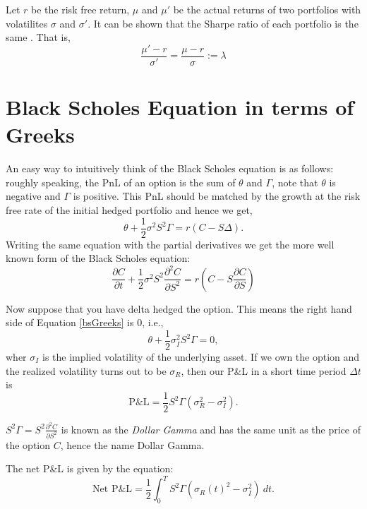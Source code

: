 \documentclass{amsart}
\theoremstyle{plain}
\numberwithin{equation}{section}
\begin{document}
Let $r$ be the risk free return, $\mu$ and $\mu'$ be the 
actual returns of two portfolios with volatilites
$\sigma$ and $\sigma'$. It can be shown that
the Sharpe ratio of each portfolio is 
the same \cite{derman_smile}.
That is,
\begin{equation}
\frac{\mu'-r}{\sigma'} = 
\frac{\mu-r}{\sigma} := \lambda
\end{equation}


\section{Black Scholes Equation in terms of Greeks}
An easy way to intuitively think of the Black Scholes
equation is as follows: roughly speaking, the PnL of 
an option is the sum of $\theta$ and $\Gamma$, note that 
$\theta$ is negative and $\Gamma$ is positive. This PnL
should be matched by the growth at the risk free rate
of the initial hedged portfolio and hence we get,
\begin{equation}
\label{bsGreeks}
\theta + \frac{1}{2}
\sigma^2 S^2 \Gamma
= r(C-S\Delta).
\end{equation}
Writing the same equation with the partial 
derivatives we get the more well known form of the 
Black Scholes equation:
\begin{equation}
\frac{\partial C}{\partial t} + \frac{1}{2}
\sigma^2 S^2 \frac{\partial^2 C}{\partial S^2}
= r(C-S\frac{\partial C}{\partial S})
\end{equation}

Now suppose that you have delta hedged the 
option. This means the right hand side of Equation
\ref{bsGreeks} is $0$, i.e.,\
\begin{equation}
\theta + \frac{1}{2}
\sigma_{I}^2 S^2 \Gamma = 0,
\end{equation}
wher $\sigma_{I}$ is the implied
volatility of the underlying 
asset. If we own the option and the 
realized volatility turns out 
to be $\sigma_{R}$,
then our P\&L in a short time period
$\Delta t$ is 
\begin{equation}
\mbox{P\&L} = 
\frac{1}{2} S^2 \Gamma
\left(\sigma_{R}^2 - \sigma_{I}^2 \right).
\end{equation}

$S^2\Gamma = S^2 \frac{\partial^2 C}{\partial S^2}$ 
is known as the \emph{Dollar Gamma} and has the 
same unit as the price of the option $C$, hence 
the name Dollar Gamma.

The net P\&L is given by the equation:
\begin{equation}
\mbox{Net P\&L} = 
\frac{1}{2} 
\int_{0}^{T}
S^2 \Gamma
\left(\sigma_{R}(t)^2 - \sigma_{I}^2 \right) \:dt.
\end{equation}
\end{document}
